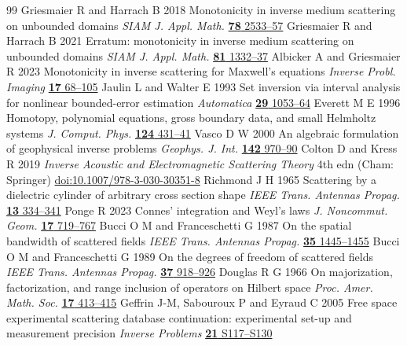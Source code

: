 \begin{thebibliography}{99}
Griesmaier R and Harrach B 2018 Monotonicity in inverse medium scattering on unbounded domains \emph{SIAM J. Appl. Math.} \href{https://doi.org/10.1137/18M1171679}{\textbf{78} 2533--57}
Griesmaier R and Harrach B 2021 Erratum: monotonicity in inverse medium scattering on unbounded domains \emph{SIAM J. Appl. Math.} \href{https://doi.org/10.1137/21M1399221}{\textbf{81} 1332--37}
 Albicker A and Griesmaier R 2023 Monotonicity in inverse scattering for Maxwell's equations \emph{Inverse Probl. Imaging} \href{https://doi.org/10.3934/ipi.2022032}{\textbf{17} 68--105}
Jaulin L and Walter E 1993 Set inversion via interval analysis for nonlinear bounded-error estimation \emph{Automatica} \href{https://doi.org/10.1016/0005-1098(93)90106-4}{\textbf{29} 1053--64}
Everett M E 1996 Homotopy, polynomial equations, gross boundary data, and small Helmholtz systems \emph{J. Comput. Phys.} \href{https://doi.org/10.1006/jcph.1996.0070}{\textbf{124} 431--41}
Vasco D W 2000 An algebraic formulation of geophysical inverse problems \emph{Geophys. J. Int.} \href{https://doi.org/10.1046/j.1365-246x.2000.00188.x}{\textbf{142} 970--90}
 Colton D and Kress R 2019 \emph{Inverse Acoustic and Electromagnetic Scattering Theory} 4th edn (Cham: Springer) \href{https://doi.org/10.1007/978-3-030-30351-8}{doi:10.1007/978-3-030-30351-8}
 Richmond J H 1965 Scattering by a dielectric cylinder of arbitrary cross section shape \emph{IEEE Trans. Antennas Propag.} \href{https://doi.org/10.1109/TAP.1965.1138427}{\textbf{13} 334--341}
 Ponge R 2023 Connes\textquoteright{} integration and Weyl\textquoteright{}s laws \emph{J. Noncommut. Geom.} \href{https://doi.org/10.4171/JNCG/509}{\textbf{17} 719--767}
 Bucci O M and Franceschetti G 1987 On the spatial bandwidth of scattered fields \emph{IEEE Trans. Antennas Propag.} \href{https://doi.org/10.1109/TAP.1987.1144024}{\textbf{35} 1445--1455}
 Bucci O M and Franceschetti G 1989 On the degrees of freedom of scattered fields \emph{IEEE Trans. Antennas Propag.} \href{https://doi.org/10.1109/8.29386}{\textbf{37} 918--926}
 Douglas R G 1966 On majorization, factorization, and range inclusion of operators on Hilbert space \emph{Proc. Amer. Math. Soc.} \href{https://doi.org/10.1090/S0002-9939-1966-0203464-1}{\textbf{17} 413--415}
 Geffrin J-M, Sabouroux P and Eyraud C 2005 Free space experimental scattering database continuation: experimental set-up and measurement precision \emph{Inverse Problems} \href{https://doi.org/10.1088/0266-5611/21/6/S09}{\textbf{21} S117--S130}

\end{thebibliography}
